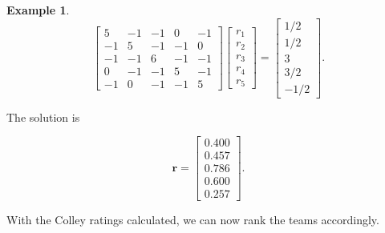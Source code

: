 \documentclass[
]{book}
\theoremstyle{definition}
\theoremstyle{definition}
\newtheorem{example}{Example}[chapter]
\theoremstyle{definition}
\theoremstyle{definition}
\theoremstyle{remark}
\begin{document}
\begin{examplebox}
\begin{example}
\[\begin{bmatrix}
5 & -1 & -1 & 0 & -1\\
-1 & 5 & -1 & -1 & 0\\
-1 & -1 & 6 & -1 & -1\\
0 & -1 & -1 & 5 & -1\\
-1 & 0 & -1 & -1 & 5
\end{bmatrix}\begin{bmatrix}r_1\\r_2\\r_3\\r_4\\r_5\end{bmatrix}=\begin{bmatrix} 1/2\\1/2\\3\\3/2\\-1/2\end{bmatrix}.\]

The solution is

\[\mathbf{r}=\begin{bmatrix} 0.400\\0.457\\0.786\\0.600\\0.257\end{bmatrix}.\]

With the Colley ratings calculated, we can now rank the teams accordingly.


\end{example}
\end{examplebox}
\end{document}
